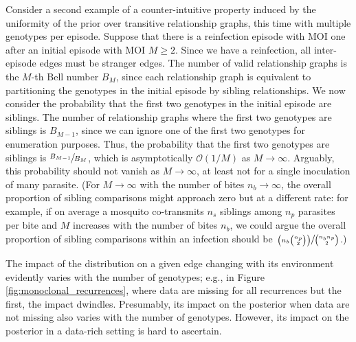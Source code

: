 \documentclass{article}
\begin{document}
Consider a second example of a counter-intuitive property induced by the uniformity of the prior over transitive relationship graphs, this time with multiple genotypes per episode. Suppose that there is a reinfection episode with MOI one after an initial episode with MOI $M\ge 2$. Since we have a reinfection, all inter-episode edges must be stranger edges. The number of valid relationship graphs is the $M$-th Bell number $B_M$, since each relationship graph is equivalent to partitioning the genotypes in the initial episode by sibling relationships. We now consider the probability that the first two genotypes in the initial episode are siblings. The number of relationship graphs where the first two genotypes are siblings is $B_{M-1}$, since we can ignore one of the first two genotypes for enumeration purposes. Thus, the probability that the first two genotypes are siblings is $\sfrac{B_{M-1}}{B_M}$, which is asymptotically $\mathcal{O}(1/M)$ as $M\rightarrow\infty$. Arguably, this probability should not vanish as $M\rightarrow\infty$, at least not for a single inoculation of many parasite. (For $M\rightarrow\infty$ with the number of bites $n_b\rightarrow\infty$, the overall proportion of sibling comparisons might approach zero but at a different rate: for example, if on average a mosquito co-transmits $n_s$ siblings among $n_p$ parasites per bite and $M$ increases with the number of bites $n_b$, we could argue the overall proportion of sibling comparisons within an infection should be $\sfrac{\left(n_b \binom{n_p}{2} \right)}{\binom{n_b n_p}{2}}$.)

The impact of the distribution on a given edge changing with its environment evidently varies with the number of genotypes; e.g., in Figure \ref{fig:monoclonal_recurrences}, where data are missing for all recurrences but the first, the impact dwindles. Presumably, its impact on the posterior when data are not missing also varies with the number of genotypes. However, its impact on the posterior in a data-rich setting is hard to ascertain. 

\end{document}
